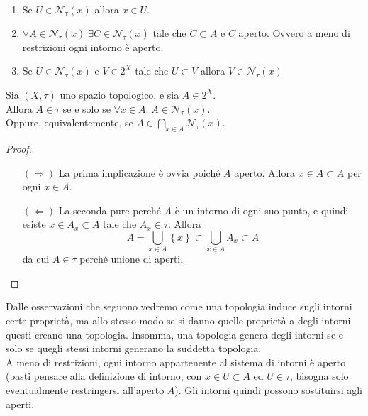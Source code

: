\begin{remark} \
	\label{rmk:intorni_top}
	\begin{enumerate}
		\item Se $U \in \mathcal{N}_\tau(x)$ allora $x \in U$.
		\item $\forall A \in \mathcal{N}_\tau(x) \; \exists C \in \mathcal{N}_\tau(x)$ tale che $C \subset A$ e $C$ aperto. Ovvero a meno di restrizioni ogni intorno è aperto.
		\item Se $U \in \mathcal{N}_\tau(x)$ e $V \in 2^X$ tale che $U \subset V$ allora $V \in \mathcal{N}_\tau(x)$ 
	\end{enumerate}	
\end{remark}

\begin{proposition}
	Sia $(X,\tau)$ uno spazio topologico, e sia $A \in 2^X$. \\ Allora $A \in \tau$ se e solo se $\forall x \in A . \; A \in \mathcal{N}_\tau(x)$. \\ Oppure,  equivalentemente, se $A \in \bigcap_{x \in A} \mathcal{N}_\tau(x)$.
\end{proposition}
\begin{proof} \
	\begin{enumerate}
		\item[$(\Rightarrow)$] La prima implicazione è ovvia poiché $A$ aperto. Allora $x \in A \subset A$ per ogni $x \in A$.
		\item[$(\Leftarrow)$]	La seconda pure perché $A$ è un intorno di ogni suo punto, e quindi esiste $x \in A_x \subset A$ tale che $A_x \in \tau$. Allora
		\begin{equation*}
			A = \bigcup_{x \in A} \left\{x\right\} \subset \bigcup_{x\in A} A_x \subset A
		\end{equation*}
		da cui $A \in \tau$ perché unione di aperti. 
	\end{enumerate}
\end{proof}

Dalle osservazioni che seguono vedremo come una topologia induce sugli intorni certe proprietà, ma allo stesso modo se si danno quelle proprietà a degli intorni questi creano una topologia. Insomma, una topologia genera degli intorni se e solo se quegli stessi intorni generano la suddetta topologia. \\ A meno di restrizioni, ogni intorno appartenente al sistema di intorni è aperto (basti pensare alla definizione di intorno, con $x \in U \subset A$ ed $U \in \tau$, bisogna solo eventualmente restringersi all'aperto $A$). Gli intorni quindi possono sostituirsi agli aperti.

